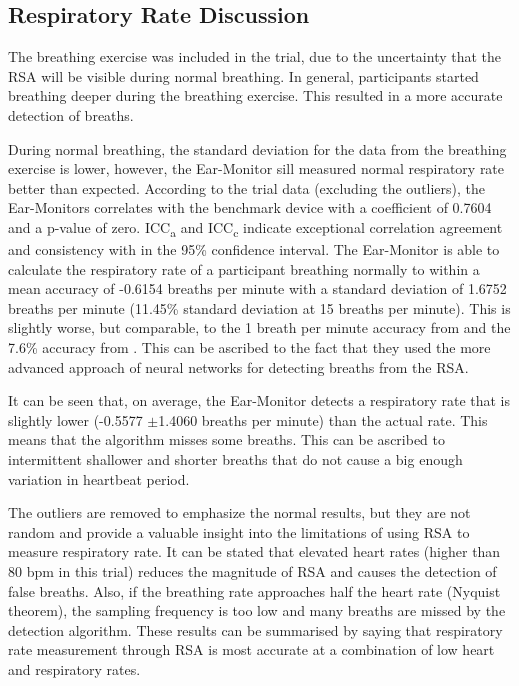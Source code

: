 \subsection{Respiratory Rate Discussion}
The breathing exercise was included in the trial, due to the uncertainty that the RSA will be visible during normal breathing. In general, participants started breathing deeper during the breathing exercise. This resulted in a more accurate detection of breaths.

\medskip

During normal breathing, the standard deviation for the data from the breathing exercise is lower, however, the Ear-Monitor sill measured normal respiratory rate better than expected. According to the trial data (excluding the outliers), the Ear-Monitors correlates with the  benchmark device with a coefficient of 0.7604 and a p-value of zero. ICC\textsubscript{a} and ICC\textsubscript{c} indicate exceptional correlation agreement and consistency with in the 95\% confidence interval. The Ear-Monitor is able to calculate the respiratory rate of a participant breathing normally to within a mean accuracy of -0.6154 breaths per minute with a standard deviation of 1.6752 breaths per minute (11.45\% standard deviation at 15 breaths per minute). This is slightly worse, but comparable, to the 1 breath per minute accuracy from \cite{clifton2007measurement} and the 7.6\% accuracy from \cite{leonard2006fully}. This can be ascribed to the fact that they used the more advanced approach of neural networks for detecting breaths from the RSA.

\medskip

It can be seen that, on average, the Ear-Monitor detects a respiratory rate that is slightly lower (-0.5577 $\pm$1.4060 breaths per minute) than the actual rate. This means that the algorithm misses some breaths. This can be ascribed to intermittent shallower and shorter breaths that do not cause a big enough variation in heartbeat period.

\medskip

The outliers are removed to emphasize the normal results, but they are not random and provide a valuable insight into the limitations of using RSA to measure respiratory rate. It can be stated that elevated heart rates (higher than 80 bpm in this trial) reduces the magnitude of RSA  and causes the detection of false breaths. Also, if the breathing rate approaches half the heart rate (Nyquist theorem), the sampling frequency is too low and many breaths are missed by the detection algorithm. These results can be summarised by saying that respiratory rate measurement through RSA is most accurate at a combination of low heart and respiratory rates.

